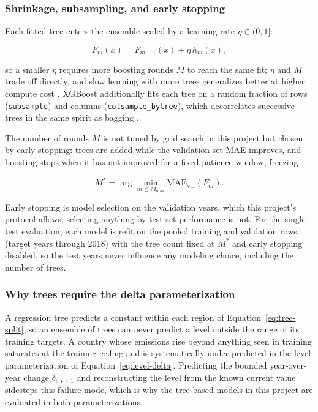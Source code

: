 \subsubsection{Shrinkage, subsampling, and early stopping}

Each fitted tree enters the ensemble scaled by a learning rate
$\eta \in (0, 1]$:

\begin{equation}
\label{eq:xgb-shrinkage}
F_m(x) = F_{m-1}(x) + \eta\, h_m(x),
\end{equation}

so a smaller $\eta$ requires more boosting rounds $M$ to reach the same
fit; $\eta$ and $M$ trade off directly, and slow learning with more trees
generalizes better at higher compute cost \cite{friedman2001greedy}.
XGBoost additionally fits each tree on a random fraction of rows
(\texttt{subsample}) and columns (\texttt{colsample\_bytree}), which
decorrelates successive trees in the same spirit as bagging
\cite{chen2016xgboost}.

The number of rounds $M$ is not tuned by grid search in this project but
chosen by early stopping: trees are added while the validation-set MAE
improves, and boosting stops when it has not improved for a fixed patience
window, freezing

\begin{equation}
\label{eq:xgb-early-stop}
M^{*} = \arg\min_{m \le M_{\max}} \mathrm{MAE}_{\mathrm{val}}(F_m).
\end{equation}

Early stopping is model selection on the validation years, which this
project's protocol allows; selecting anything by test-set performance is
not. For the single test evaluation, each model is refit on the pooled
training and validation rows (target years through 2018) with the tree
count fixed at $M^{*}$ and early stopping disabled, so the test years
never influence any modeling choice, including the number of trees.

\subsubsection{Why trees require the delta parameterization}

A regression tree predicts a constant within each region of
Equation~\ref{eq:tree-split}, so an ensemble of trees can never predict a
level outside the range of its training targets. A country whose emissions
rise beyond anything seen in training saturates at the training ceiling
and is systematically under-predicted in the level parameterization of
Equation~\ref{eq:level-delta}. Predicting the bounded year-over-year
change $\delta_{c,t+1}$ and reconstructing the level from the known
current value sidesteps this failure mode, which is why the tree-based
models in this project are evaluated in both parameterizations.
